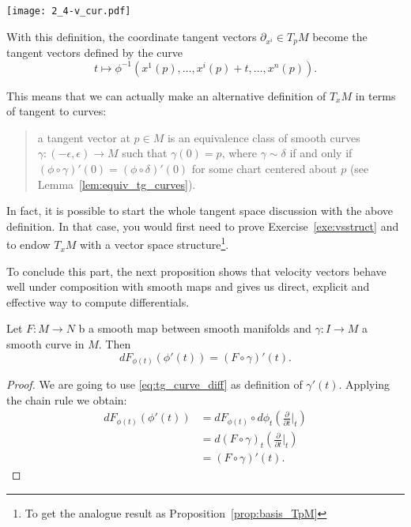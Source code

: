 \begin{marginfigure}
    \texttt{[image: 2\_4-v\_cur.pdf]}
    \caption{With this definition, the coordinate tangent vectors $\partial_{x^i}\in T_p M$ become the tangent vectors defined by the curve \[t \mapsto \phi^{-1}(x^1(p), \ldots, {x^i(p) + t}, \ldots, x^n(p)).\]}
    \label{fig:2_4-v_cur}
\end{marginfigure}
This means that we can actually make an alternative definition of $T_xM$ in terms of tangent to curves:
\begin{quote}
    a tangent vector at $p\in M$ is an equivalence class of smooth curves $\gamma:(-\epsilon, \epsilon)\to M$ such that $\gamma(0)=p$, where $\gamma\sim\delta$ if and only if $(\phi\circ \gamma)'(0) = (\phi\circ\delta)'(0)$ for some chart centered about $p$ (see Lemma~\ref{lem:equiv_tg_curves}).
\end{quote}

In fact, it is possible to start the whole tangent space discussion with the above definition. In that case, you would first need to prove Exercise~\ref{exe:vsstruct} and to endow $T_xM$ with a vector space structure\footnote{To get the analogue result as Proposition~\ref{prop:basis_TpM}}.

To conclude this part, the next proposition shows that velocity vectors behave well under composition with smooth maps and gives us direct, explicit and effective way to compute differentials.

\begin{prop}\label{prop:curves_deriv}
    Let $F:M\to N$ b a smooth map between smooth manifolds and $\gamma:I\to M$ a smooth curve in $M$.
    Then
    \begin{equation}
        d F_{\phi(t)} (\phi'(t)) = (F\circ\gamma)'(t).
    \end{equation}
\end{prop}
\begin{proof}
    We are going to use \eqref{eq:tg_curve_diff} as definition of $\gamma'(t)$.
    Applying the chain rule we obtain:
    \begin{align}
        d F_{\phi(t)} (\phi'(t))
        &= d F_{\phi(t)} \circ d\phi_t \left(\frac{\partial}{\partial t}\Big|_t\right) \\
        &= d (F\circ\gamma)_t \left(\frac{\partial}{\partial t}\Big|_t\right) \\
        &= (F\circ\gamma)'(t).
    \end{align}
\end{proof}

